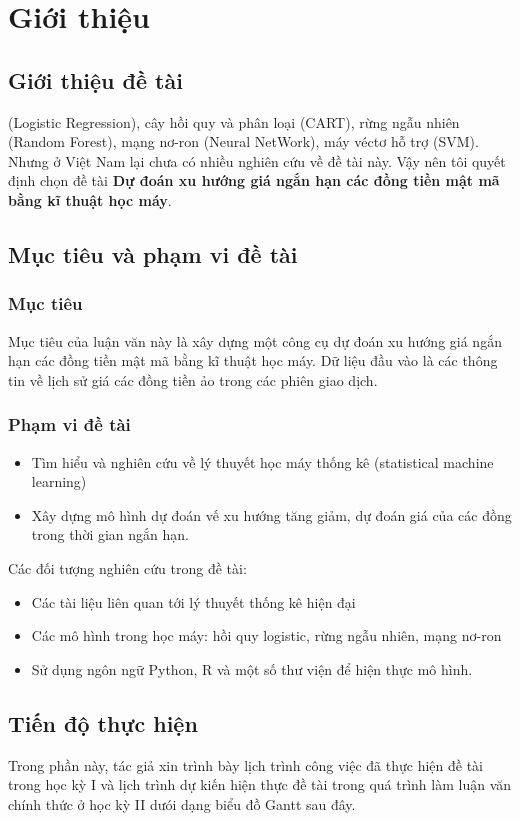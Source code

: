 \chapter{Giới thiệu} 
\section{Giới thiệu đề tài}
(Logistic Regression), cây hồi quy và phân loại (CART),
rừng ngẫu nhiên (Random Forest),
mạng nơ-ron (Neural NetWork),
máy véctơ hỗ trợ (SVM).
Nhưng ở Việt Nam lại chưa có nhiều nghiên cứu về đề tài này.
Vậy nên tôi quyết định chọn đề tài \textbf{Dự đoán xu hướng giá ngắn hạn các đồng tiền mật mã bằng kĩ thuật học máy}.
\section{Mục tiêu và phạm vi đề tài}
\subsection{Mục tiêu}
Mục tiêu của luận văn này là xây dựng một công cụ dự đoán xu hướng giá ngắn hạn
các đồng tiền mật mã bằng kĩ thuật học máy. Dữ liệu đầu vào là các thông tin về
lịch sử giá các  đồng tiền ảo trong các phiên giao dịch.
\subsection{Phạm vi đề tài}
\begin{itemize}
\item Tìm hiểu và nghiên cứu về lý thuyết học máy thống kê (statistical machine learning)
\item Xây dựng mô hình dự đoán vế xu hướng tăng giảm, dự đoán giá của các đồng trong thời gian ngắn hạn.
\end{itemize}
Các đối tượng nghiên cứu trong đề tài:
\begin{itemize}
\item Các tài liệu liên quan tới lý thuyết thống kê hiện đại
\item Các mô hình trong học máy: hồi quy logistic, rừng ngẫu nhiên, mạng nơ-ron
\item Sử dụng ngôn ngữ Python, R và một số thư viện để hiện thực mô hình.
\end{itemize}

\section{Tiến độ thực hiện}
Trong phần này, tác giả xin trình bày lịch trình công việc đã thực hiện đề tài trong học
kỳ I và lịch trình dự kiến hiện thực đề tài trong quá trình làm luận văn chính thức ở học
kỳ II dưói dạng biểu đồ Gantt sau đây.

